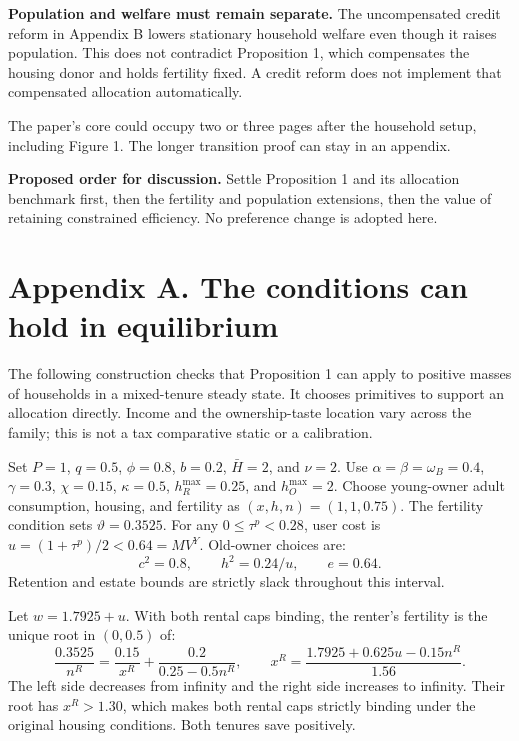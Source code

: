 \documentclass[11pt]{article}
\newcommand{\pageheading}[1]{\section*{#1}}
\begin{document}
\textbf{Population and welfare must remain separate.} The uncompensated
credit reform in Appendix B lowers stationary household welfare even though
it raises population. This does not contradict Proposition 1, which compensates
the housing donor and holds fertility fixed. A credit reform does not implement
that compensated allocation automatically.

The paper's core could occupy two or three pages after the household setup,
including Figure 1. The longer transition proof can stay in an appendix.

\textbf{Proposed order for discussion.} Settle Proposition 1 and its allocation
benchmark first, then the fertility and population extensions, then the value
of retaining constrained efficiency. No preference change is adopted here.

\newpage
\pageheading{Appendix A. The conditions can hold in equilibrium}

The following construction checks that Proposition 1 can apply to positive
masses of households in a mixed-tenure steady state. It chooses primitives
to support an allocation directly. Income and the ownership-taste location
vary across the family; this is not a tax comparative static or a calibration.

Set $P=1$, $q=0.5$, $\phi=0.8$, $b=0.2$, $\bar H=2$, and $\nu=2$.
Use $\alpha=\beta=\omega_B=0.4$, $\gamma=0.3$, $\chi=0.15$, $\kappa=0.5$,
$h_R^{\max}=0.25$, and $h_O^{\max}=2$. Choose young-owner adult consumption,
housing, and fertility as $(x,h,n)=(1,1,0.75)$. The fertility condition sets
$\vartheta=0.3525$. For any $0\leq\tau^p<0.28$, user cost is
$u=(1+\tau^p)/2<0.64=MV^Y$. Old-owner choices are:
\begin{equation}
 c^2=0.8,\qquad h^2=0.24/u,\qquad e=0.64.
 \label{eq:simple_witness_old}
\end{equation}
Retention and estate bounds are strictly slack throughout this interval.

Let $w=1.7925+u$. With both rental caps binding, the renter's fertility is the
unique root in $(0,0.5)$ of:
\begin{equation}
 \frac{0.3525}{n^R}=\frac{0.15}{x^R}
 +\frac{0.2}{0.25-0.5n^R},\qquad
 x^R=\frac{1.7925+0.625u-0.15n^R}{1.56}.
 \label{eq:simple_witness_renter}
\end{equation}
The left side decreases from infinity and the right side increases to
infinity. Their root has $x^R>1.30$, which makes both rental caps strictly
binding under the original housing conditions. Both tenures save positively.
\end{document}
